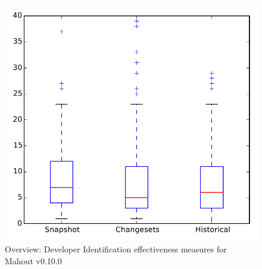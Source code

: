 
\begin{figure}
\centering
\includegraphics[height=0.4\textheight]{figures/dit/all_mahout}
\caption{Overview: Developer Identification effectiveness measures for Mahout v0.10.0}
\label{fig:dit:all:mahout}
\end{figure}
